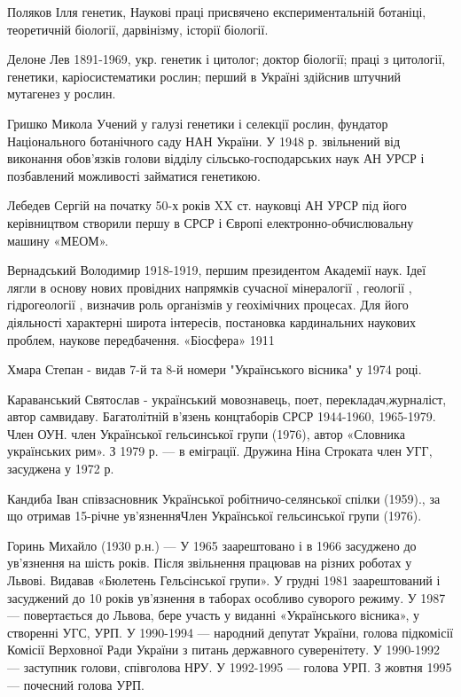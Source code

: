 Поляков Ілля генетик, Наукові праці присвячено експериментальній ботаніці, теоретичній біології, дарвінізму, історії біології.

Делоне Лев 1891-1969, укр. генетик і цитолог; доктор біології; праці з цитології, генетики, каріосистематики рослин; перший в Україні здійснив штучний мутагенез у рослин.

Гришко Микола Учений у галузі генетики і селекції рослин, фундатор Національного ботанічного саду НАН України. У 1948 р. звільнений від виконання обов'язків голови відділу сільсько-господарських наук АН УРСР і позбавлений можливості займатися генетикою.

Лебедев Сергій на початку 50-х років XX ст. науковці АН УРСР під його керівництвом створили першу в СРСР і Європі електронно-обчислювальну машину «МЕОМ».

Вернадський Володимир 1918-1919, першим президентом Академії наук. Ідеї лягли в основу нових провідних напрямків сучасної мінералогії , геології , гідрогеології , визначив роль організмів у геохімічних процесах. Для його діяльності характерні широта інтересів, постановка кардинальних наукових проблем, наукове передбачення. «Біосфера» 1911

Хмара Степан  - видав 7-й та 8-й номери "Українського вісника" у 1974 році.

Караванський Святослав - український мовознавець, поет, перекладач,журналіст, автор самвидаву. Багатолітній в'язень концтаборів СРСР 1944-1960, 1965-1979. Член ОУН. член Української гельсинської групи (1976), автор «Словника українських рим». З 1979 р. --- в еміграції. Дружина Ніна Строката член УГГ, засуджена у 1972 р.

Кандиба Іван співзасновник Української робітничо-селянської спілки (1959)., за що отримав 15-річне ув’язненняЧлен Української гельсинської групи (1976).

Горинь Михайло (1930 р.н.) --- У 1965 заарештовано і в 1966 засуджено до ув'язнення на шість років. Після звільнення працював на різних роботах у Львові. Видавав «Бюлетень Гельсінської групи». У грудні 1981 заарештований і засуджений до 10 років ув'язнення в таборах особливо суворого режиму. У 1987 --- повертається до Львова, бере участь у виданні «Українського вісника», у створенні УГС, УРП. У 1990-1994 --- народний депутат України, голова підкомісії Комісії Верховної Ради України з питань державного суверенітету. У 1990-1992 --- заступник голови, співголова НРУ. У 1992-1995 --- голова УРП. З жовтня 1995 --- почесний голова УРП.

